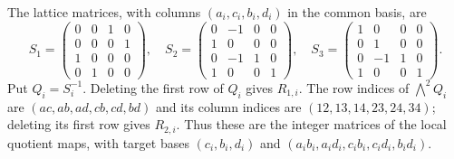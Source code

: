 The lattice matrices, with columns $(a_i,c_i,b_i,d_i)$ in the common basis,
are
\[
S_1=\begin{pmatrix}0&0&1&0\\0&0&0&1\\1&0&0&0\\0&1&0&0\end{pmatrix},\quad
S_2=\begin{pmatrix}0&-1&0&0\\1&0&0&0\\0&-1&1&0\\1&0&0&1\end{pmatrix},\quad
S_3=\begin{pmatrix}1&0&0&0\\0&1&0&0\\0&-1&1&0\\1&0&0&1\end{pmatrix}.
\]
Put $Q_i=S_i^{-1}$. Deleting the first row of $Q_i$ gives $R_{1,i}$.
The row indices of $\bigwedge^2Q_i$ are $(ac,ab,ad,cb,cd,bd)$ and its
column indices are $(12,13,14,23,24,34)$; deleting its first row gives
$R_{2,i}$. Thus these are the integer matrices of the local quotient maps,
with target bases $(c_i,b_i,d_i)$ and $(a_ib_i,a_id_i,c_ib_i,c_id_i,b_id_i)$.

